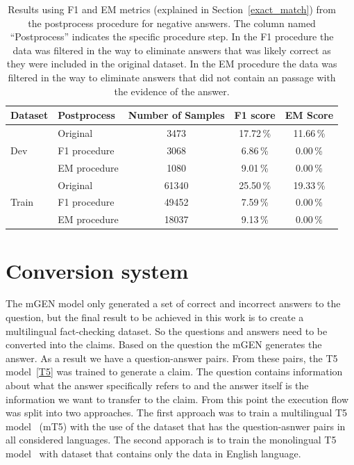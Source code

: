 \begin{table}[H]
    \centering
    \begin{tabular}{l|lccc}
        \hline
         Dataset & Postprocess & Number of Samples & F1 score & EM Score \\
        \hline
        \multirow{3}{*}{Dev} & Original & 3473 & 17.72\,\% & 11.66\,\% \\
         &  F1 procedure & 3068 & 6.86\,\% & 0.00\,\% \\
         &  EM procedure & 1080 & 9.01\,\% & 0.00\,\% \\
         \hline
        \multirow{3}{*}{Train} & Original & 61340 &  25.50\,\% & 19.33\,\% \\
         & F1 procedure & 49452 &  7.59\,\% & 0.00\,\% \\
         & EM procedure & 18037 &  9.13\,\% & 0.00\,\% \\
        \hline
    \end{tabular}
    \caption{Results using F1 and EM metrics (explained in Section~\ref{exact_match}) from the postprocess procedure for negative answers. The column named ``Postprocess'' indicates the specific procedure step. In the F1 procedure the data was filtered in the way to eliminate answers that was likely correct as they were included in the original dataset. In the EM procedure the data was filtered in the way to eliminate answers that did not contain an passage with the evidence of the answer.}
    \label{tab:mgen_negative}
\end{table}

\section{Conversion system} \label{t5_proposed}
The mGEN model only generated a set of correct and incorrect answers to the question, but the final result to be achieved in this work is to create a multilingual fact-checking dataset. So the questions and answers need to be converted into the claims. Based on the question the mGEN generates the answer. As a result we have a question-answer pairs. From these pairs, the T5 model~\ref{T5} was trained to generate a claim. The question contains information about what the answer specifically refers to and the answer itself is the information we want to transfer to the claim. From this point the execution flow was split into two approaches. The first approach was to train a multilingual T5 model~\cite{mt5} (mT5) with the use of the dataset that has the question-asnwer pairs in all considered languages. The second apporach is to train the monolingual T5 model~\cite{T5} with dataset that contains only the data in English language.

